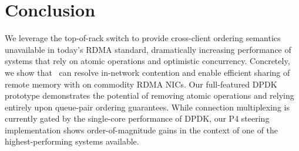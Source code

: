 \section{Conclusion}

We leverage the top-of-rack switch to provide cross-client ordering
semantics unavailable in today's RDMA standard, dramatically
increasing performance of systems that rely on atomic operations and
optimistic concurrency.  Concretely, we show that \sword\ can resolve
in-network contention and enable efficient sharing of remote memory
with on commodity RDMA NICs.
 Our full-featured DPDK prototype demonstrates the potential of
 removing atomic operations and relying entirely upon queue-pair
 ordering guarantees.  While connection multiplexing is currently
 gated by the single-core performance of DPDK, our P4 steering
 implementation shows order-of-magnitude gains in the context of one
 of the highest-performing systems available.


